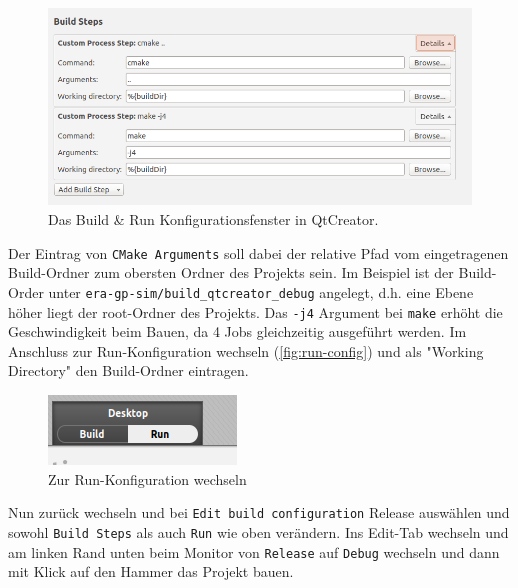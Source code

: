 \begin{figure}[h!]
	\centering
	\includegraphics[scale=0.5]{images/setup-qtcreator-buildrun-config.png}
	\caption{Das Build \& Run Konfigurationsfenster in QtCreator.}
  \label{fig:build-run}
\end{figure}

Der Eintrag von \texttt{CMake Arguments} soll dabei der relative Pfad vom
eingetragenen Build-Ordner zum obersten Ordner des Projekts sein. Im Beispiel
ist der Build-Order unter \texttt{era-gp-sim/build\_qtcreator\_debug} angelegt,
d.h. eine Ebene höher liegt der root-Ordner des Projekts. Das \texttt{-j4}
Argument bei \texttt{make} erhöht die Geschwindigkeit beim Bauen, da 4 Jobs
gleichzeitig ausgeführt werden. Im Anschluss zur Run-Konfiguration wechseln
(\autoref{fig:run-config}) und als "Working Directory" den Build-Ordner
eintragen.

\begin{figure}[h!]
	\centering
	\includegraphics[trim={0 0.4cm 0.8cm 0}, clip]{images/setup-qtcreator-run-config}
	\caption{Zur Run-Konfiguration wechseln}
	\label{fig:run-config}
\end{figure}

Nun zurück wechseln und bei \texttt{Edit build configuration} Release auswählen
und sowohl \texttt{Build Steps} als auch \texttt{Run} wie oben verändern. Ins
Edit-Tab wechseln und am linken Rand unten beim Monitor von \texttt{Release} auf
\texttt{Debug} wechseln und dann mit Klick auf den Hammer das Projekt bauen.

